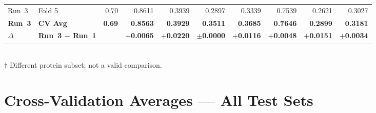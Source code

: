 \documentclass[10pt, a4paper]{article}
\newcommand{\good}[1]{\textcolor{okgreen}{\textbf{#1}}}
\begin{document}
\begin{table}[ht]
{\begin{tabular}{L L N N N N N N N N}
Run~3 & Fold 5 & 0.70 & 0.8611 & 0.3939 & 0.2897 & 0.3339 & 0.7539 & 0.2621 & 0.3027 \\
\textbf{Run~3} & \textbf{CV Avg} & \textbf{0.69} & \textbf{0.8563} & \textbf{0.3929} & \textbf{0.3511} & \textbf{0.3685} & \textbf{0.7646} & \textbf{0.2899} & \textbf{0.3181} \\
\midrule
\good{$\Delta$} & \good{Run~3 $-$ Run~1} & & \good{$+$0.0065} & \good{$+$0.0220} & \good{$\pm$0.0000} & \good{$+$0.0116} & \good{$+$0.0048} & \good{$+$0.0151} & \good{$+$0.0034} \\
\bottomrule
\end{tabular}}
\smallskip\\
{\footnotesize $\dagger$ Different protein subset; not a valid comparison.}
\end{table}

\section{Cross-Validation Averages --- All Test Sets}
\end{document}
